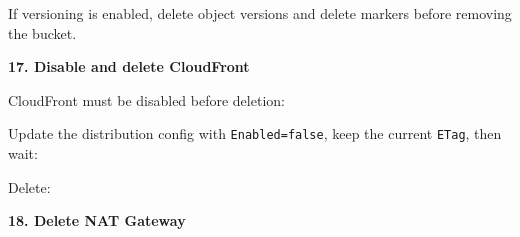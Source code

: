 If versioning is enabled, delete object versions and delete markers
before removing the bucket.

\vspace{0.5em}\noindent\textbf{17. Disable and delete
CloudFront}\par

CloudFront must be disabled before deletion:

\begin{Shaded}
\begin{Highlighting}[]
\end{Highlighting}
\end{Shaded}

Update the distribution config with \texttt{Enabled=false}, keep the
current \texttt{ETag}, then wait:

\begin{Shaded}
\begin{Highlighting}[]
\end{Highlighting}
\end{Shaded}

Delete:

\begin{Shaded}
\begin{Highlighting}[]
\DataTypeTok{\textbackslash{}}
  \DataTypeTok{\textbackslash{}}
   \OperatorTok{\textless{}}\OperatorTok{\textgreater{}}
\end{Highlighting}
\end{Shaded}

\vspace{0.5em}\noindent\textbf{18. Delete NAT Gateway}\par

\begin{Shaded}
\begin{Highlighting}[]
 \OperatorTok{\textless{}}\OperatorTok{\textgreater{}}
\end{Highlighting}
\end{Shaded}

